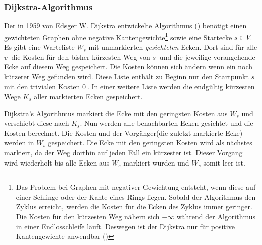 \subsubsection{Dijkstra-Algorithmus}
\label{sec:dijkstra}
Der in 1959 von Edsger W. Dijkstra entwickelte Algorithmus (\cite{dijkstra}) benötigt einen gewichteten Graphen ohne negative Kantengewichte\footnote{Das Problem bei Graphen mit negativer Gewichtung entsteht, wenn diese auf einer Schlinge oder der Kante eines Rings liegen.
Sobald der Algorithmus den Zyklus erreicht, werden die Kosten für die Ecken des Zyklus immer geringer.
Die Kosten für den kürzesten Weg nähern sich $-\infty $ während der Algorithmus in einer Endlosschleife läuft.
Deswegen ist der Dijkstra nur für positive Kantengewichte anwendbar (\cite[194\psq]{kurt})} sowie eine Startecke $s \in V$.
Es gibt eine Warteliste $W_{s}$ mit unmarkierten \textit{gesichteten} Ecken.
Dort sind für alle $v~$ die Kosten für den bisher kürzesten Weg von $s~$ und die jeweilige vorangehende Ecke auf diesem Weg gespeichert.
Die Kosten können sich ändern wenn ein noch kürzerer Weg gefunden wird.
Diese Liste enthält zu Beginn nur den Startpunkt $s~$ mit den trivialen Kosten $0~$.
In einer weitere Liste werden die endgültig kürzesten Wege $K_{s}$ aller markierten Ecken gespeichert.

Dijkstra's Algorithmus markiert die Ecke mit den geringsten Kosten aus $W_{s}$ und verschiebt diese nach $K_{s}$.
Nun werden alle benachbarten Ecken gesichtet und die Kosten berechnet.
Die Kosten und der Vorgänger(die zuletzt markierte Ecke) werden in $W_{s}$ gespeichert.
Die Ecke mit den geringsten Kosten wird als nächstes markiert, da der Weg dorthin auf jeden Fall ein kürzester ist.
Dieser Vorgang wird wiederholt bis alle Ecken aus $W_{s}$ markiert wurden und $W_{s}$ somit leer ist.

